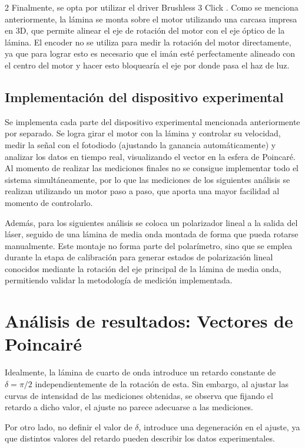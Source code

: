 \documentclass[11pt,a4paper]{article}
\begin{document}
\begin{multicols}{2}
Finalmente, se opta por utilizar el driver Brushless 3 Click \cite{driver}. Como se menciona anteriormente, la lámina se monta sobre el motor utilizando una carcasa impresa en 3D, que permite alinear el eje de rotación del motor con el eje óptico de la lámina. El encoder no se utiliza para medir la rotación del motor directamente, ya que para lograr esto es necesario que el imán esté perfectamente alineado con el centro del motor y hacer esto bloquearía el eje por donde pasa el haz de luz. 


\subsection{Implementación del dispositivo experimental}
Se implementa cada parte del dispositivo experimental mencionada anteriormente por separado. Se logra girar el motor con la lámina y controlar su velocidad, medir la señal con el fotodiodo (ajustando la ganancia automáticamente) y analizar los datos en tiempo real, visualizando el vector en la esfera de Poincaré. Al momento de realizar las mediciones finales no se consigue implementar todo el sistema simultáneamente, por lo que las mediciones de los siguientes análisis se realizan utilizando un motor paso a paso, que aporta una mayor facilidad al momento de controlarlo. 

Además, para los siguientes análisis se coloca un polarizador lineal a la salida del láser, seguido de una lámina de media onda montada de forma que pueda rotarse manualmente. Este montaje no forma parte del polarímetro, sino que se emplea durante la etapa de calibración para generar estados de polarización lineal conocidos mediante la rotación del eje principal de la lámina de media onda, permitiendo validar la metodología de medición implementada.

\section{Análisis de resultados: Vectores de Poincairé}

Idealmente, la lámina de cuarto de onda introduce un retardo constante de $\delta = \pi/2$ independientemente de la rotación de esta. Sin embargo, al ajustar las curvas de intensidad de las mediciones obtenidas, se observa que fijando el retardo a dicho valor, el ajuste no parece adecuarse a las mediciones.

Por otro lado, no definir el valor de $\delta$, introduce una degeneración en el ajuste, ya que distintos valores del retardo pueden describir los datos experimentales.


\end{multicols}
\end{document}
